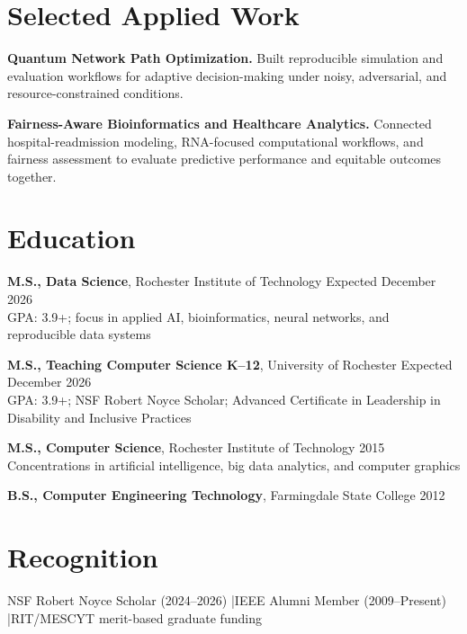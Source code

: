 \documentclass[10pt,letterpaper]{article}
\begin{document}
\section*{Selected Applied Work}
\textbf{Quantum Network Path Optimization.}
Built reproducible simulation and evaluation workflows for adaptive
decision-making under noisy, adversarial, and resource-constrained conditions.

\textbf{Fairness-Aware Bioinformatics and Healthcare Analytics.}
Connected hospital-readmission modeling, RNA-focused computational workflows,
and fairness assessment to evaluate predictive performance and equitable
outcomes together.

\section*{Education}
\textbf{M.S., Data Science}, Rochester Institute of Technology
\hfill Expected December 2026\\
GPA: 3.9+; focus in applied AI, bioinformatics, neural networks, and
reproducible data systems

\textbf{M.S., Teaching Computer Science K--12}, University of Rochester
\hfill Expected December 2026\\
GPA: 3.9+; NSF Robert Noyce Scholar; Advanced Certificate in Leadership in
Disability and Inclusive Practices

\textbf{M.S., Computer Science}, Rochester Institute of Technology
\hfill 2015\\
Concentrations in artificial intelligence, big data analytics, and computer
graphics

\textbf{B.S., Computer Engineering Technology}, Farmingdale State College
\hfill 2012

\section*{Recognition}
NSF Robert Noyce Scholar (2024--2026)
\enspace|\enspace IEEE Alumni Member (2009--Present)
\enspace|\enspace RIT/MESCYT merit-based graduate funding
\end{document}

